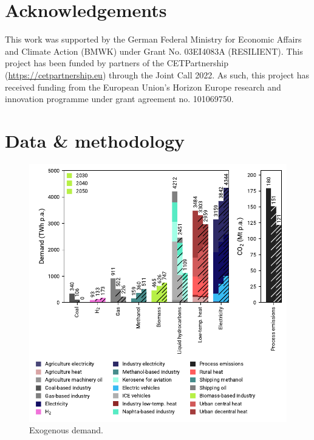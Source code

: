 \documentclass[final,5p,times,twocolumn,sort&compress]{elsarticle}
\begin{document}
\section*{Acknowledgements}
This work was supported by the German Federal Ministry for Economic Affairs and Climate Action (BMWK) under Grant No. 03EI4083A (RESILIENT). This project has been funded by partners of the CETPartnership (\href{https://cetpartnership.eu}{https://cetpartnership.eu}) through the Joint Call 2022. As such, this project has received funding from the European Union's Horizon Europe research and innovation programme under grant agreement no. 101069750.


\appendix

\section{Data \& methodology}
\label{app:data_methodology}

\begin{figure}[htbp]
  \centering
  \includegraphics[width=\linewidth]{exogenous_demand.pdf}
  \caption{Exogenous demand.}
  \label{fig:exogenous_demand}
\end{figure}
\end{document}

